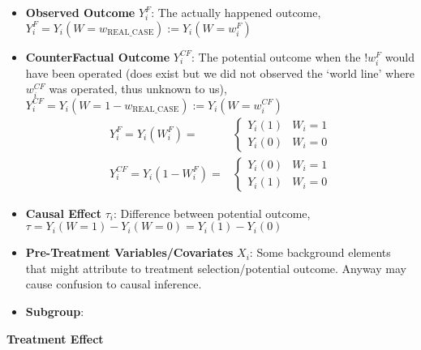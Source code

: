 \begin{itemize}[topsep=2pt,itemsep=0pt]
{    Maybe can be seen as what would happen when the operation had not been done.} In simple model, use $ Y_i(1) $ for treatment and $ Y_i(0) $ for control.
    \item \textbf{Observed Outcome} $ Y_i^F $: The actually happened outcome, $ Y_i^F=Y_i(W=w_\mathrm{REAL\_CASE}):=Y_i(W=w^F_i) $
    \item \textbf{CounterFactual Outcome} $ Y_i^{CF} $: The potential outcome when the $ !w_i^F $ would have been operated (does exist but we did not observed the `world line' where $ w^{CF}_i $ was operated, thus unknown to us), $ Y_i^{CF}=Y_i(W=1-w_\mathrm{REAL\_CASE}):=Y_i(W=w_i^{CF}) $ 
    \begin{align*}
        Y^F_i=Y_i(W_i^F)=&\begin{cases}
            Y_i(1)&W_i=1\\
            Y_i(0)&W_i=0
        \end{cases}\\
        Y^{CF}_i=Y_i(1-W_i^F)=&\begin{cases}
            Y_i(0)&W_i=1\\
            Y_i(1)&W_i=0
        \end{cases}
    \end{align*}
    \item \textbf{Causal Effect} $ \tau_i $: Difference between potential outcome, $ \tau=Y_i(W=1)-Y_i(W=0)=Y_i(1)-Y_i(0) $
    \item \textbf{Pre-Treatment Variables/Covariates} $ X_i $: Some background elements that might attribute to treatment selection/potential outcome. Anyway may cause confusion to causal inference.
    \item \textbf{Subgroup}:   
\end{itemize}


\begin{point}
    \textbf{Treatment Effect}  
\end{point}

